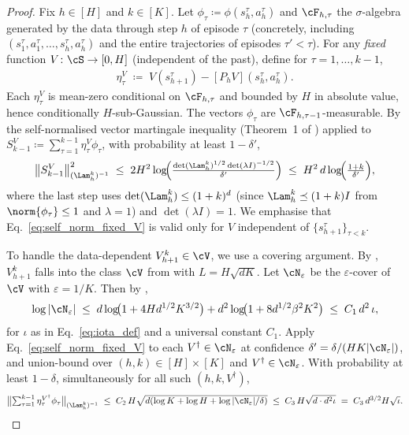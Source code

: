 \begin{proof}
Fix $h \in [H]$ and $k \in [K]$. Let $\phi_\tau \coloneqq \phi(s_h^\tau, a_h^\tau)$ and $\cF_{h, \tau}$ the $\sigma$-algebra generated by the data through step $h$ of episode $\tau$ (concretely, including $(s_1^\tau, a_1^\tau, \ldots, s_h^\tau, a_h^\tau)$ and the entire trajectories of episodes $\tau' < \tau$). For any \emph{fixed} function $V \colon \cS \to [0, H]$ (independent of the past), define for $\tau = 1, \ldots, k-1$,
\begin{align*}
\eta_\tau^V \;\coloneqq\; V(s_{h+1}^\tau) - [P_h V](s_h^\tau, a_h^\tau).
\end{align*}
Each $\eta_\tau^V$ is mean-zero conditional on $\cF_{h, \tau}$ and bounded by $H$ in absolute value, hence conditionally $H$-sub-Gaussian. The vectors $\phi_\tau$ are $\cF_{h, \tau-1}$-measurable. By the self-normalised vector martingale inequality (Theorem~1 of \cite{abbasi2011improved}) applied to $S_{k-1}^V \coloneqq \sum_{\tau=1}^{k-1} \eta_\tau^V \phi_\tau$, with probability at least $1 - \delta'$,
\begin{align}\label{eq:self_norm_fixed_V}
\bigl\| S_{k-1}^V \bigr\|_{(\Lam_h^k)^{-1}}^2
\;\le\; 2 H^2 \log\!\Bigl( \tfrac{\det(\Lam_h^k)^{1/2} \det(\lambda I)^{-1/2}}{\delta'} \Bigr)
\;\le\; H^2 \, d \log\!\Bigl( \tfrac{1 + k}{\delta'} \Bigr),
\end{align}
where the last step uses $\det(\Lam_h^k) \le (1 + k)^d$ (since $\Lam_h^k \preceq (1 + k) I$ from $\norm{\phi_\tau} \le 1$ and $\lambda = 1$) and $\det(\lambda I) = 1$. We emphasise that Eq.~\eqref{eq:self_norm_fixed_V} is valid only for $V$ independent of $\{s_{h+1}^\tau\}_{\tau < k}$.

To handle the data-dependent $V_{h+1}^k \in \cV$, we use a covering argument. By , $V_{h+1}^k$ falls into the class $\cV$ from  with $L = H \sqrt{d K}$. Let $\cN_\varepsilon$ be the $\varepsilon$-cover of $\cV$ with $\varepsilon = 1 / K$. Then by ,
\begin{align*}
\log |\cN_\varepsilon|
\;\le\; d \log\!\bigl(1 + 4 H d^{1/2} K^{3/2}\bigr) + d^2 \log\!\bigl(1 + 8 d^{1/2} \beta^2 K^2\bigr)
\;\le\; C_1 \, d^2 \, \iota,
\end{align*}
for $\iota$ as in Eq.~\eqref{eq:iota_def} and a universal constant $C_1$. Apply Eq.~\eqref{eq:self_norm_fixed_V} to each $V^\dagger \in \cN_\varepsilon$ at confidence $\delta' = \delta / (H K |\cN_\varepsilon|)$, and union-bound over $(h, k) \in [H] \times [K]$ and $V^\dagger \in \cN_\varepsilon$. With probability at least $1 - \delta$, simultaneously for all such $(h, k, V^\dagger)$,
\begin{align}\label{eq:union_bound_V_dag}
\bigl\| \textstyle\sum_{\tau=1}^{k-1} \eta_\tau^{V^\dagger} \phi_\tau \bigr\|_{(\Lam_h^k)^{-1}}
\;\le\; C_2 \, H \sqrt{d (\log K + \log H + \log |\cN_\varepsilon| / \delta)}
\;\le\; C_3 \, H \sqrt{d \cdot d^2 \iota}
\;=\; C_3 \, d^{3/2} H \sqrt{\iota}.
\end{align}


\end{proof}
